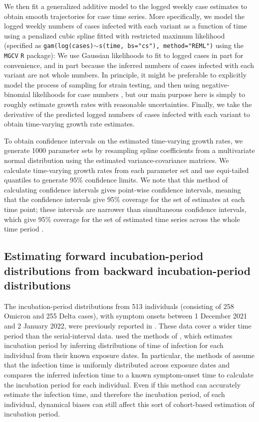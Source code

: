 \documentclass[12pt]{article}
\begin{document}
We then fit a generalized additive model \citep{wood2001mgcv} to the logged weekly case estimates to obtain smooth trajectories for case time series.
More specifically, we model the logged weekly numbers of cases infected with each variant as a function of time using a penalized cubic spline fitted with restricted maximum likelihood (specified as \texttt{gam(log(cases)$\sim$s(time, bs="cs"), method="REML")} using the \texttt{MGCV} \texttt{R} package):
We use Gaussian likelihoods to fit to logged cases in part for convenience, and in part because the inferred numbers of cases infected with each variant are not whole numbers.
In principle, it might be preferable to explicitly model the process of sampling for strain testing, and then using negative-binomial likelihoods for case numbers \citep{ver2007quasi}, but our main purpose here is simply to roughly estimate growth rates with reasonable uncertainties.
Finally, we take the derivative of the predicted logged numbers of cases infected with each variant to obtain time-varying growth rate estimates.

To obtain confidence intervals on the estimated time-varying growth rates, we generate 1000 parameter sets by resampling spline coefficients from a multivariate normal distribution using the estimated variance-covariance matrices.
We calculate time-varying growth rates from each parameter set and use equi-tailed quantiles to generate 95\% confidence limits. 
We note that this method of calculating confidence intervals gives point-wise confidence intervals, meaning that the confidence intervals give 95\% coverage for the set of estimates at each time point;
these intervals are narrower than simultaneous confidence intervals, which give 95\% coverage for the set of estimated time series across the whole time period \citep{simpson2017}.

\subsection{Estimating forward incubation-period distributions from backward incubation-period distributions}

The incubation-period distributions from 513 individuals (consisting of 258 Omicron and 255 Delta cases), with symptom onsets between 1 December 2021 and 2 January 2022, were previously reported in \cite{backer2021omicron}.
These data cover a wider time period than the serial-interval data.
\cite{backer2021omicron} used the methods of \cite{backer2020incubation}, which estimates incubation period by inferring distributions of time of infection for each individual from their known exposure dates.
In particular, the methods of \cite{backer2020incubation} assume that the infection time is uniformly distributed across exposure dates and compares the inferred infection time to a known symptom-onset time to calculate the incubation period for each individual.
Even if this method can accurately estimate the infection time, and therefore the incubation period, of each individual, dynamical biases can still affect this sort of cohort-based estimation of incubation period.
\end{document}
